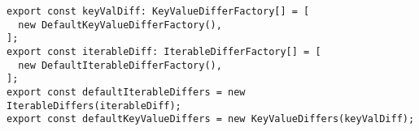 \begin{verbatim}
export const keyValDiff: KeyValueDifferFactory[] = [
  new DefaultKeyValueDifferFactory(),
];
export const iterableDiff: IterableDifferFactory[] = [
  new DefaultIterableDifferFactory(),
];
export const defaultIterableDiffers = new IterableDiffers(iterableDiff);
export const defaultKeyValueDiffers = new KeyValueDiffers(keyValDiff);
\end{verbatim}
